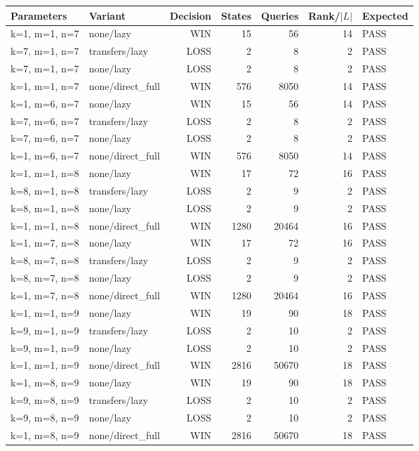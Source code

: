 \begin{longtable}{llrrrrl}
\toprule
Parameters & Variant & Decision & States & Queries & Rank/$|L|$ & Expected \\
\midrule
\endhead
k=1, m=1, n=7 & none/lazy & WIN & 15 & 56 & 14 & PASS \\
k=7, m=1, n=7 & transfers/lazy & LOSS & 2 & 8 & 2 & PASS \\
k=7, m=1, n=7 & none/lazy & LOSS & 2 & 8 & 2 & PASS \\
k=1, m=1, n=7 & none/direct\_full & WIN & 576 & 8050 & 14 & PASS \\
k=1, m=6, n=7 & none/lazy & WIN & 15 & 56 & 14 & PASS \\
k=7, m=6, n=7 & transfers/lazy & LOSS & 2 & 8 & 2 & PASS \\
k=7, m=6, n=7 & none/lazy & LOSS & 2 & 8 & 2 & PASS \\
k=1, m=6, n=7 & none/direct\_full & WIN & 576 & 8050 & 14 & PASS \\
k=1, m=1, n=8 & none/lazy & WIN & 17 & 72 & 16 & PASS \\
k=8, m=1, n=8 & transfers/lazy & LOSS & 2 & 9 & 2 & PASS \\
k=8, m=1, n=8 & none/lazy & LOSS & 2 & 9 & 2 & PASS \\
k=1, m=1, n=8 & none/direct\_full & WIN & 1280 & 20464 & 16 & PASS \\
k=1, m=7, n=8 & none/lazy & WIN & 17 & 72 & 16 & PASS \\
k=8, m=7, n=8 & transfers/lazy & LOSS & 2 & 9 & 2 & PASS \\
k=8, m=7, n=8 & none/lazy & LOSS & 2 & 9 & 2 & PASS \\
k=1, m=7, n=8 & none/direct\_full & WIN & 1280 & 20464 & 16 & PASS \\
k=1, m=1, n=9 & none/lazy & WIN & 19 & 90 & 18 & PASS \\
k=9, m=1, n=9 & transfers/lazy & LOSS & 2 & 10 & 2 & PASS \\
k=9, m=1, n=9 & none/lazy & LOSS & 2 & 10 & 2 & PASS \\
k=1, m=1, n=9 & none/direct\_full & WIN & 2816 & 50670 & 18 & PASS \\
k=1, m=8, n=9 & none/lazy & WIN & 19 & 90 & 18 & PASS \\
k=9, m=8, n=9 & transfers/lazy & LOSS & 2 & 10 & 2 & PASS \\
k=9, m=8, n=9 & none/lazy & LOSS & 2 & 10 & 2 & PASS \\
k=1, m=8, n=9 & none/direct\_full & WIN & 2816 & 50670 & 18 & PASS \\

\end{longtable}
